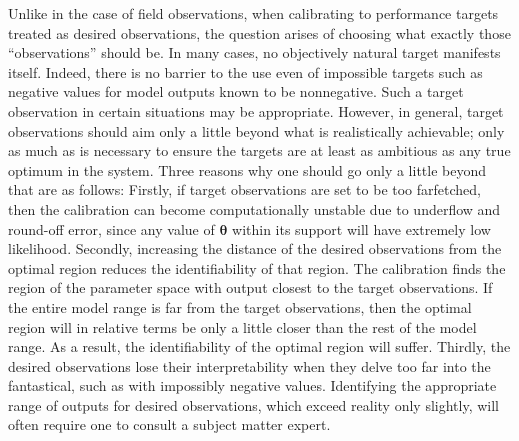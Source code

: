 \documentclass[12pt]{article}
\begin{document}


Unlike in the case of field observations, when calibrating to performance targets treated as desired observations, the question arises of choosing what exactly those ``observations'' should be.
%
In many cases, no objectively natural target manifests itself. 
%
Indeed, there is no barrier to the use even of impossible targets such as negative values for model outputs known to be nonnegative.
%
Such a target observation in certain situations may be appropriate. 
%
However, in general, target observations should aim only a little beyond what is realistically achievable; only as much as is necessary to ensure the targets are at least as ambitious as any true optimum in the system.
%
Three reasons why one should go only a little beyond that are as follows: 
%
Firstly, if target observations are set to be too farfetched, then the calibration can become computationally unstable due  to underflow and round-off error, since any value of $\boldsymbol \theta$ within its support will have extremely low likelihood.
%
Secondly, increasing the distance of the desired observations from the optimal region reduces the identifiability of that region.
%
The calibration finds the region of the parameter space with output closest to the target observations.
%
If the entire model range is far from the target observations, then the optimal region will in relative terms be only a little closer than the rest of the model range. 
% 
As a result, the identifiability of the optimal region will suffer.
%
%
Thirdly, the desired observations lose their interpretability when they delve too far into the fantastical, such as with impossibly negative values. 
%
Identifying the appropriate range of outputs for desired observations, which exceed reality only slightly, will often require one to consult a subject matter expert. 
\end{document}
